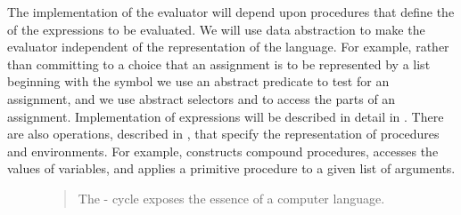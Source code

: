 The implementation of the evaluator will depend upon procedures that define the
 of the expressions to be evaluated.  We will use data
abstraction to make the evaluator independent of the representation of the
language.  For example, rather than committing to a choice that an assignment
is to be represented by a list beginning with the symbol  we use an
abstract predicate  to test for an assignment, and we use
abstract selectors  and  to
access the parts of an assignment.  Implementation of expressions will be
described in detail in .  There are also operations,
described in , that specify the representation of procedures
and environments.  For example,  constructs compound
procedures,  accesses the values of variables, and
 applies a primitive procedure to a given list
of arguments.

\begin{figure}[tb]
\label{Figure 4.1}
\centering
\begin{comment}
\heading{Figure 4.1:} The \code{eval}-\code{apply} cycle exposes the essence of a computer language.

\begin{example}
                           .,ad88888888baa,
                  _    ,d8P"""        ""9888ba.      _
                 /  .a8"          ,ad88888888888a   |\
               /   aP'          ,88888888888888888a   \
              /  ,8"           ,88888888888888888888,  \
             |  ,8'            (888888888888888888888, |
            /  ,8'             `8888888888888888888888  \
            |  8)               `888888888888888888888, |
Procedure,  |  8                  "88888 Apply 8888888) | Expression
Arguments   |  8     Eval          `888888888888888888) | Environment
            |  8)                    "8888888888888888  |
            \  (b                     "88888888888888'  /
             | `8,                     8888888888888)  |
             \  "8a                   ,888888888888)  /
              \   V8,                 d88888888888"  /
              _\| `8b,             ,d8888888888P' _/
                     `V8a,       ,ad8888888888P'
                        ""88888888888888888P"
                             """"""""""""

                               [graphic by Normand Veillux, modified]
\end{example}
\end{comment}

\begin{quote}
 The - cycle exposes the essence of a computer language.
\end{quote}
\end{figure}



